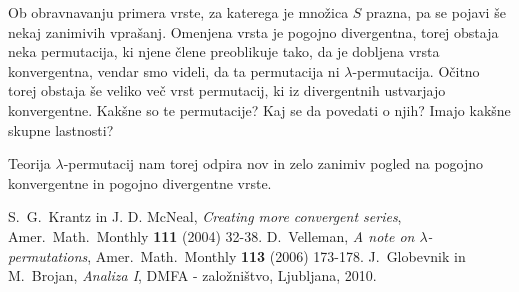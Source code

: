 \documentclass[12pt,a4paper,reqno]{amsart}
\theoremstyle{definition} %
\theoremstyle{plain} %
\begin{document}
Ob obravnavanju primera vrste, za katerega je množica $S$ prazna, pa se pojavi še nekaj zanimivih vprašanj. Omenjena vrsta je pogojno divergentna, torej obstaja neka permutacija, ki njene člene preoblikuje tako, da je dobljena vrsta konvergentna, vendar smo videli, da ta permutacija ni $\lambda$-permutacija. Očitno torej obstaja še veliko več vrst permutacij, ki iz divergentnih ustvarjajo konvergentne. Kakšne so te permutacije? Kaj se da povedati o njih? Imajo kakšne skupne lastnosti?

Teorija $\lambda$-permutacij nam torej odpira nov in zelo zanimiv pogled na pogojno konvergentne in pogojno divergentne vrste.



\begin{thebibliography}{99}

S.~G.~Krantz in J. D. McNeal, \textit{Creating more convergent series}, Amer.~Math.~Monthly \textbf{111} (2004) 32-38.
D.~Velleman, \textit{A note on $\lambda$-permutations}, Amer.~Math.~Monthly \textbf{113} (2006) 173-178.
J.~Globevnik in M.~Brojan, \textit{Analiza I},  DMFA - založništvo, Ljubljana, 2010.

\end{thebibliography}
\end{document}
